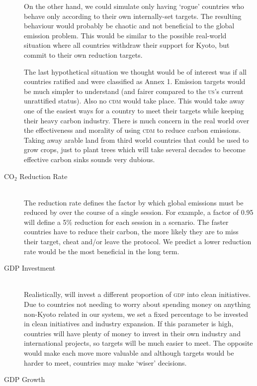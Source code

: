 \begin{description}
On the other hand, we could simulate only having `rogue' countries who behave only according to their own internally-set targets. The resulting behaviour would probably be chaotic and not beneficial to the global emission problem. This would be similar to the possible real-world situation where all countries withdraw their support for Kyoto, but commit to their own reduction targets.

The last hypothetical situation we thought would be of interest was if all countries ratified and were classified as Annex 1. Emission targets would be much simpler to understand (and fairer compared to the \textsc{us}'s current unrattified status). Also no \textsc{cdm} would take place. This would take away one of the easiest ways for a country to meet their targets while keeping their heavy carbon industry. There is much concern in the real world over the effectiveness and morality of using \textsc{cdm} to reduce carbon emissions. Taking away arable land from third world countries that could be used to grow crops, just to plant trees which will take several decades to become effective carbon sinks sounds very dubious.

\item[CO$_2$ Reduction Rate] \hfill \\

The reduction rate defines the factor by which global emissions must be reduced by over the course of a single session. For example, a factor of 0.95 will define a 5\% reduction for each session in a scenario. The faster countries have to reduce their carbon, the more likely they are to miss their target, cheat and/or leave the protocol. We predict a lower reduction rate would be the most beneficial in the long term.

\item[GDP Investment] \hfill \\

Realistically, will invest a different proportion of \textsc{gdp} into clean initiatives. Due to countries not needing to worry about spending money on anything non-Kyoto related in our system, we set a fixed percentage to be invested in clean initiatives and industry expansion. If this parameter is high, countries will have plenty of money to invest in their own industry and international projects, so targets will be much easier to meet. The opposite would make each move more valuable and although targets would be harder to meet, countries may make `wiser' decisions.

\item[GDP Growth] \hfill \\


\end{description}
